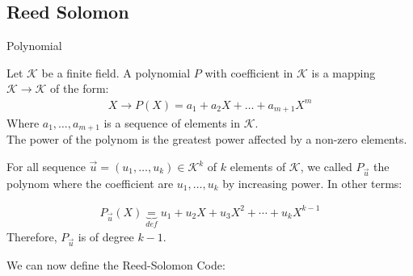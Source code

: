 \subsection{Reed Solomon}

\begin{parag}{Polynomial}
    
    \begin{definition}
        Let $\mathcal{K}$ be a finite field. A polynomial $P$ with coefficient in $\mathcal{K}$ is a mapping $\mathcal{K} \to \mathcal{K}$ of the form:
        \begin{align*} 
            X \to P\left(X\right) =  a_1 + a_2X + \ldots + a_{m+1} X^m
        \end{align*}
        Where $a_1, \ldots, a_{m+1}$ is a sequence of elements in $\mathcal{K}$.\\
        The power of the polynom is the greatest power affected by a non-zero elements.
    \end{definition}
    For all sequence $\vec{u} =  \left(u_1, \ldots, u_k\right) \in \mathcal{K}^k$ of $k$ elements of $\mathcal{K}$, we called $P_{\vec{u}}$ the polynom where the coefficient are $u_1, \ldots, u_k$ by increasing power. In other terms:
    \begin{definition}
    \begin{align*} 
        P_{\vec{u}}\left(X\right) \underbrace{= }_{def} u_1 + u_2X + u_3X^2 + \cdots + u_kX^{k-1}
    \end{align*}
    Therefore, $P_{\vec{u}}$ is of degree $k-1$. 
    \end{definition}
    We can now define the Reed-Solomon Code:
\end{parag}



